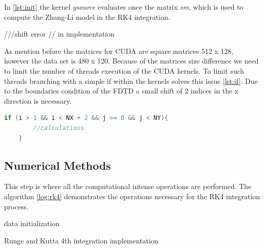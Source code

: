 In \ref{lst:init} the kernel \textit{gsource} evaluates once the matrix \textit{sm}, which is used to compute the Zhang-Li model in the RK4 integration. 

///shift error
// in implementation

As mention before the matrices for CUDA are square matrices 512 x 128, however the data set is 480 x 120. Because of the matrices size difference we need to limit the number of threads execution of the CUDA kernels. To limit such threads branching with a simple if within the kernels solves this issue \ref{lst:if}. Due to the boundaries condition of the FDTD a small shift of 2 indices in the x direction is necessary. 

\begin{lstlisting}[language=C++, label={lst:if}, caption={Laplacian X using global memory}]
    if (i > 1 && i < NX + 2 && j >= 0 && j < NY){
    	//calculations
    }
\end{lstlisting}

\subsection{Numerical Methods}

This step is where all the computational intense operations are performed. The algorithm \ref{log:rk4} demonstrates the operations necessary for the RK4 integration process.

\begin{algorithm}[H]
 data initialization\;
 \label{log:rk4}
 \caption{Runge and Kutta 4th integration implementation}
\end{algorithm}

